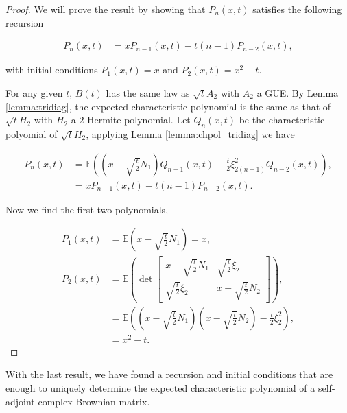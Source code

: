 \begin{proof}

    We will prove the result by showing that $P_n(x,t)$ satisfies the following recursion
    
    \begin{align*}
        P_n(x,t) &= x P_{n-1}(x,t) - t(n-1)P_{n-2}(x,t),
    \end{align*}

    \noindent with initial conditions $P_1(x,t) = x$ and $P_2(x,t) = x^2-t$.

    For any given $t$, $B(t)$ has the same law as $\sqrt{t}A_2$ with $A_2$ a GUE. By Lemma \ref{lemma:tridiag}, the expected characteristic polynomial is the same as that of $\sqrt{t}H_2$ with $H_2$ a $2$-Hermite polynomial. Let $Q_n(x,t)$ be the characteristic polyomial of $\sqrt{t}H_2$, applying Lemma \ref{lemma:chpol_tridiag} we have

    \begin{align*}
        P_n(x,t) &= \mathbb E \left(  \left( x - \sqrt{\frac t2}N_1 \right) Q_{n-1}(x,t) - \frac t2 \xi_{2(n-1)}^2 Q_{n-2}(x,t)\right), \\ 
        &= x P_{n-1}(x,t) - t(n-1)P_{n-2}(x,t).
    \end{align*}

    Now we find the first two polynomials,

    \begin{align*}
        P_1(x,t) &= \mathbb E \left( x - \sqrt{\frac t2}N_1 \right) = x,\\
        P_2(x,t) &= \mathbb E \left( \det\begin{bmatrix}
            x - \sqrt{\frac t2}N_1 & \sqrt{\frac t2} \xi_2 \\ 
            \sqrt{\frac t2} \xi_2  & x - \sqrt{\frac t2}N_2                         
        \end{bmatrix} \right),\\ 
        &= \mathbb E \left( \left(x - \sqrt{\frac t2}N_1\right)\left( x - \sqrt{\frac t2}N_2 \right) - \frac t2 \xi_2^2 \right),\\ 
        &= x^2 - t.
    \end{align*}
\end{proof}

    With the last result, we have found a recursion and initial conditions that are enough to uniquely determine the expected characteristic polynomial of a self-adjoint complex Brownian matrix.

